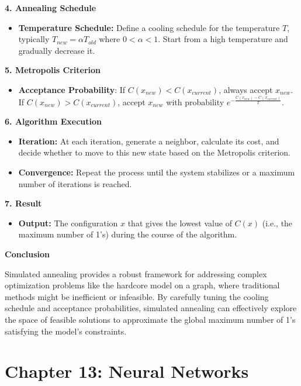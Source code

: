 \documentclass[8pt]{article}
\begin{document}
\textbf{4. Annealing Schedule}
\begin{itemize}
    \item \textbf{Temperature Schedule:} Define a cooling schedule for the temperature \( T \), typically \( T_{new} = \alpha T_{old} \) where \( 0 < \alpha < 1 \). Start from a high temperature and gradually decrease it.
\end{itemize}

\textbf{5. Metropolis Criterion}
\begin{itemize}
    \item \textbf{Acceptance Probability}: If \( C(x_{new}) < C(x_{current}) \), always accept \( x_{new} \). If \( C(x_{new}) > C(x_{current}) \), accept \( x_{new} \) with probability \( e^{-\frac{C(x_{new}) - C(x_{current})}{T}} \).
\end{itemize}

\textbf{6. Algorithm Execution}
\begin{itemize}
    \item \textbf{ Iteration:} At each iteration, generate a neighbor, calculate its cost, and decide whether to move to this new state based on the Metropolis criterion.
    \item \textbf{Convergence:} Repeat the process until the system stabilizes or a maximum number of iterations is reached.
\end{itemize}

\textbf{7. Result}
\begin{itemize}
    \item \textbf{Output:} The configuration \( x \) that gives the lowest value of \( C(x) \) (i.e., the maximum number of 1's) during the course of the algorithm.
\end{itemize}

\textbf{Conclusion}

Simulated annealing provides a robust framework for addressing complex optimization problems like the hardcore model on a graph, where traditional methods might be inefficient or infeasible. By carefully tuning the cooling schedule and acceptance probabilities, simulated annealing can effectively explore the space of feasible solutions to approximate the global maximum number of 1's satisfying the model's constraints.

\newpage
\section*{Chapter 13: Neural Networks}
\end{document}
